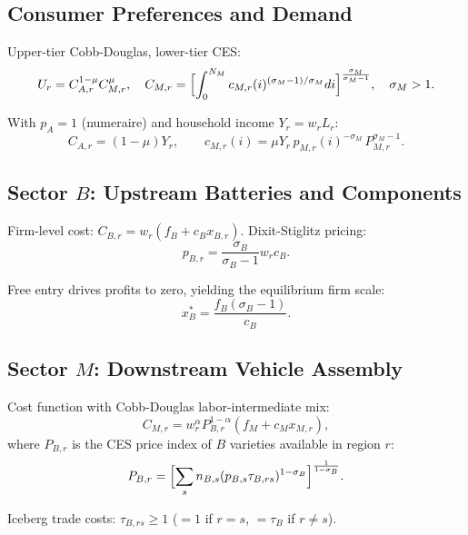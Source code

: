 \documentclass[11pt,a4paper]{article}
\newcommand{\sM}{\sigma_M}
\newcommand{\sB}{\sigma_B}
\newcommand{\tB}{\tau_B}
\newcommand{\NM}{N_M}
\begin{document}
\subsection{Consumer Preferences and Demand}

Upper-tier Cobb-Douglas, lower-tier CES:
\begin{equation}\label{eq:utility}
    U_r = C_{A,r}^{1-\mu} C_{M,r}^{\mu}, \quad
    C_{M,r} = \Bigl[ \int_0^{\NM} c_{M,r}(i)^{(\sM-1)/\sM} di \Bigr]^{\frac{\sM}{\sM-1}},\quad \sM>1.
\end{equation}

With $p_A=1$ (numeraire) and household income $Y_r = w_r L_r$:
\begin{equation}\label{eq:demand}
    C_{A,r} = (1-\mu)Y_r, \qquad
    c_{M,r}(i) = \mu Y_r \, p_{M,r}(i)^{-\sM} \, P_{M,r}^{\sM-1}.
\end{equation}

\subsection{Sector $B$: Upstream Batteries and Components}

Firm-level cost: $C_{B,r} = w_r (f_B + c_B x_{B,r})$. Dixit-Stiglitz pricing:
\begin{equation}
    p_{B,r} = \frac{\sB}{\sB-1} w_r c_B.
\end{equation}

Free entry drives profits to zero, yielding the equilibrium firm scale:
\begin{equation}
    x_B^* = \frac{f_B(\sB-1)}{c_B}.
\end{equation}

\subsection{Sector $M$: Downstream Vehicle Assembly}

Cost function with Cobb-Douglas labor-intermediate mix:
\begin{equation}
    C_{M,r} = w_r^\alpha P_{B,r}^{1-\alpha} (f_M + c_M x_{M,r}),
\end{equation}
where $P_{B,r}$ is the CES price index of $B$ varieties available in region $r$:
\begin{equation}
    P_{B,r} = \Bigl[ \sum_s n_{B,s} (p_{B,s} \tau_{B,rs})^{1-\sB} \Bigr]^{\frac{1}{1-\sB}}.
\end{equation}

Iceberg trade costs: $\tau_{B,rs} \geq 1$ ($=1$ if $r=s$, $=\tB$ if $r \neq s$).
\end{document}
